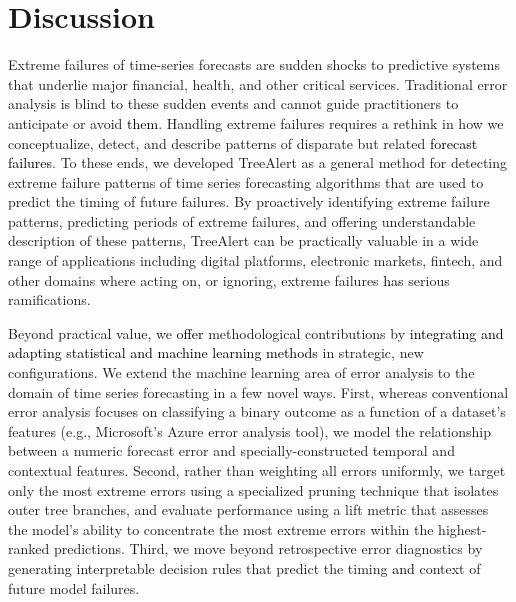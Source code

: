 \documentclass[]{interact}
\theoremstyle{plain}
\theoremstyle{definition}
\theoremstyle{remark}
\newcommand{\galit}[1]{\textcolor{black}{#1}}
\begin{document}
\FloatBarrier

\section{Discussion}

Extreme failures of time-series forecasts are sudden shocks to predictive systems that
underlie major financial, health, and other critical services. Traditional error analysis is
blind to these sudden events and cannot guide practitioners to anticipate or avoid
\galit{them}. Handling extreme failures requires a rethink in how we conceptualize, detect,
and describe patterns of disparate but related \galit{forecast failures}. To these ends, we
developed TreeAlert as a general method for detecting extreme failure patterns of time series
forecasting algorithms that \galit{are} used to predict the timing of future failures. By
proactively identifying extreme failure patterns, predicting periods of extreme failures, and
offering understandable description of these patterns, TreeAlert can be practically valuable
in a wide range of applications including digital platforms, electronic markets, fintech, and
other domains where acting on, or ignoring, extreme failures \galit{has} serious ramifications.

Beyond practical value, we \galit{offer} methodological contributions by
\galit{integrating and adapting statistical and machine learning methods} in strategic, new
configurations. We extend the machine learning area of error analysis to the domain of time
series forecasting in a few novel ways. First, whereas conventional error analysis focuses
on classifying a binary outcome as a function of a dataset's features (e.g., Microsoft's
Azure error analysis tool), we model the relationship between a numeric forecast error and
specially-constructed temporal and contextual features. Second, rather than weighting all
errors uniformly, we target only the most extreme errors using a specialized pruning
technique that isolates outer tree branches, and evaluate performance using a lift metric
that assesses the model's ability to concentrate the most extreme errors within the
highest-ranked predictions. Third, we move beyond retrospective error diagnostics by
generating interpretable decision rules that predict the timing \galit{and} context of
future model failures.
\end{document}
